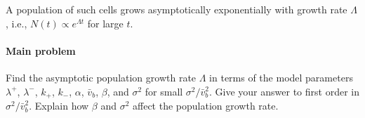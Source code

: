 A population of such cells grows asymptotically exponentially with growth rate $\Lambda$, i.e., $N(t) \propto e^{\Lambda t}$ for large $t$.

\paragraph*{Main problem}

Find the asymptotic population growth rate $\Lambda$ in terms of the model parameters $\lambda^+$, $\lambda^-$, $k_+$, $k_-$, $\alpha$, $\bar v_b$, $\beta$, and $\sigma^2$ for small $\sigma^2/\bar v_b^2$. Give your answer to first order in $\sigma^2/\bar v_b^2$. Explain how $\beta$ and $\sigma^2$ affect the population growth rate.
